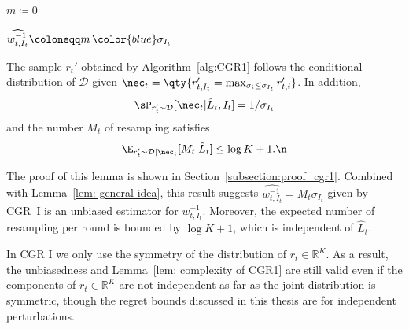 \begin{algorithm}[t]
\caption{Conditional Geometric Resampling I}
\label{alg:CGR1}

$m \coloneqq 0$\;


$\widehat{w_{t,I_t}^{-1}} \coloneqq m\,{\color{blue}\sigma_{I_t}}$\;
\end{algorithm}
\begin{lemma}\label{lem: complexity of CGR1}
The sample $r_t'$ obtained by Algorithm~\ref{alg:CGR1} follows
the conditional distribution of $\mathcal{D}$ given $\nec_t=\qty{r_{t,I_t}'=\max_{\sigma_i\leq\sigma_{I_t}}r_{t,i}'}$.
In addition,
\begin{align*}
\sP_{r_t' \sim \mathcal{D}}[\nec_t|\hat{L}_t,I_t]=1/\sigma_{I_t}
\end{align*}
and the number $M_t$ of resampling satisfies
    \begin{align}
        \E_{r_t'\sim \mathcal{D}|\nec_t}[M_t|\hat{L}_t]\leq\log K+1.\n
    \end{align}
\end{lemma}
The proof of this lemma is shown in Section~\ref{subsection:proof_cgr1}.
Combined with Lemma~\ref{lem: general idea}, this result suggests $\widehat{w_{t,I_t}^{-1}}=M_t\sigma_{I_t}$ given by CGR~I is an unbiased estimator for $w_{t,I_t}^{-1}$.
Moreover, the expected number of resampling per round is bounded by $\log K+1$, which is independent of $\hat{L}_t$.

\begin{remark}{\rm%
In CGR I we only use the symmetry of the distribution of $r_t\in\mathbb{R}^K$.
As a result, the unbiasedness and Lemma~\ref{lem: complexity of CGR1} are still valid even if
the components of $r_t\in\mathbb{R}^K$ are not independent
as far as the joint distribution is symmetric, though the regret bounds discussed in this thesis are for independent perturbations.
}\end{remark}


